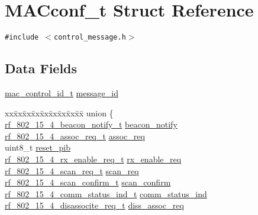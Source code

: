 \hypertarget{structMACconf__t}{
\section{MACconf\_\-t Struct Reference}
\label{structMACconf__t}
}
{\tt \#include $<$control\_\-message.h$>$}

\subsection*{Data Fields}
\begin{CompactItemize}
\item 
\hyperlink{rf__802__15__4_8h_01e0aae058da837b0908ec100a76e3d3}{mac\_\-control\_\-id\_\-t} \hyperlink{structMACconf__t_7d4dad417562c658e705accd2bf0ddd6}{message\_\-id}
\item 
\begin{tabbing}
xx\=xx\=xx\=xx\=xx\=xx\=xx\=xx\=xx\=\kill
union \{\\
\>\hyperlink{structrf__802__15__4__beacon__notify__t}{rf\_802\_15\_4\_beacon\_notify\_t} \hyperlink{structMACconf__t_798614411040fccfac2f811d38f9efb4}{beacon\_notify}\\
\>\hyperlink{structrf__802__15__4__assoc__req__t}{rf\_802\_15\_4\_assoc\_req\_t} \hyperlink{structMACconf__t_e47a1dd387bee08f7bacc39767ab40fb}{assoc\_req}\\
\>uint8\_t \hyperlink{structMACconf__t_2b7fa48ad7fcf57826a84788de348506}{reset\_pib}\\
\>\hyperlink{structrf__802__15__4__rx__enable__req__t}{rf\_802\_15\_4\_rx\_enable\_req\_t} \hyperlink{structMACconf__t_605ed174a898d40031b09106bb52652b}{rx\_enable\_req}\\
\>\hyperlink{structrf__802__15__4__scan__req__t}{rf\_802\_15\_4\_scan\_req\_t} \hyperlink{structMACconf__t_73ddbc4883498f43868b76256fabc951}{scan\_req}\\
\>\hyperlink{structrf__802__15__4__scan__confirm__t}{rf\_802\_15\_4\_scan\_confirm\_t} \hyperlink{structMACconf__t_e9b07a3ac6318d15eed2e166c751a712}{scan\_confirm}\\
\>\hyperlink{structrf__802__15__4__comm__status__ind__t}{rf\_802\_15\_4\_comm\_status\_ind\_t} \hyperlink{structMACconf__t_d549d77083fd4e3268eb07f5253d486d}{comm\_status\_ind}\\
\>\hyperlink{structrf__802__15__4__disassocite__req__t}{rf\_802\_15\_4\_disassocite\_req\_t} \hyperlink{structMACconf__t_78aa8f60a5acacc24e18bb33458945e1}{diss\_assoc\_req}\\

\end{tabbing}
\end{CompactItemize}
